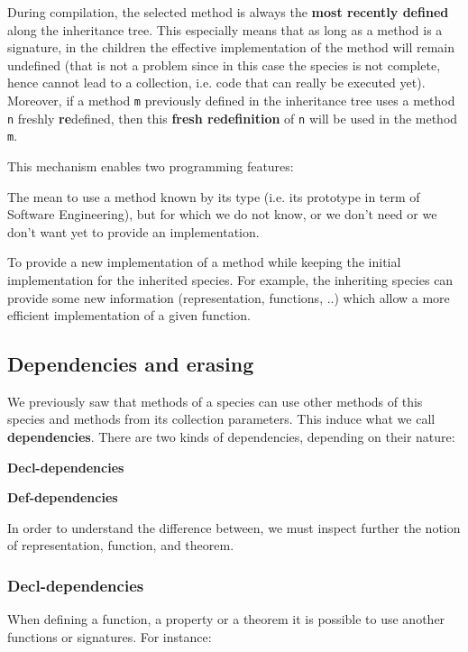During compilation, the selected method is always the {\bf most
recently defined} along the inheritance tree. This especially means
that as long as a method is a signature, in the children the effective
implementation of the method will remain undefined (that is not a
problem since in this case the species is not complete, hence cannot
lead to a collection, i.e. code that can really be executed
yet). Moreover, if a method {\tt m} previously defined in the
inheritance tree uses a method {\tt n} freshly {\bf re}defined, then
this {\bf fresh redefinition} of {\tt n} will be used in the method
{\tt m}.

\smallskip
This mechanism enables two programming features:
\begin{compact-itemize}
  \item The mean to use a method known by its type (i.e. its prototype
    in term of Software Engineering), but for which we do not know, or
    we don't need or we don't want yet to provide an implementation.

  \item To provide a new implementation of a method while  keeping the
    initial implementation for the inherited species. For example, the
    inheriting species can provide some new information
    (representation, functions, ..) which allow a more efficient
    implementation of a given function.
\end{compact-itemize}



\subsection{Dependencies and erasing}\label{dependencies}
We previously saw that methods of a species can use other methods of
this species and methods from its collection parameters. This induce
what we call {\bf dependencies}. There are two kinds
of dependencies, depending on their nature:
\begin{compact-itemize}
  \item {\bf Decl-dependencies}
  \item {\bf Def-dependencies}
\end{compact-itemize}
In order to understand the difference between, we must inspect further
the notion of representation, function, and theorem.



\subsubsection{Decl-dependencies}
When defining a function, a property or a theorem it is possible to
use another functions or signatures. For instance:

